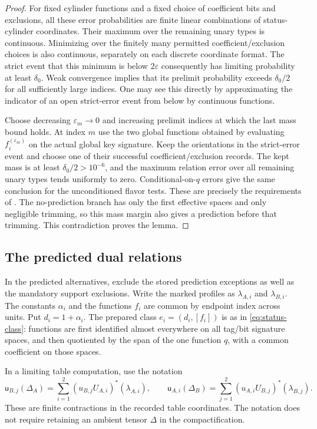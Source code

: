 \begin{proof}
For fixed cylinder functions and a fixed choice of coefficient bits
and exclusions, all these error probabilities are finite linear
combinations of status-cylinder coordinates. Their maximum over the
remaining unary types is continuous. Minimizing over the finitely many
permitted coefficient/exclusion choices is also continuous, separately
on each discrete coordinate format. The strict event that this minimum
is below $2\varepsilon$ consequently has limiting probability at least
$\delta_0$. Weak convergence implies that its prelimit probability
exceeds $\delta_0/2$ for all sufficiently large indices. One may see
this directly by approximating the indicator of an open strict-error
event from below by continuous functions.

Choose decreasing $\varepsilon_m\to0$ and increasing prelimit indices
at which the last mass bound holds. At index $m$ use the two global
functions obtained by evaluating $f_i^{(\varepsilon_m)}$ on the actual
global key signature. Keep the orientations in the strict-error event
and choose one of their successful coefficient/exclusion records.
The kept mass is at least $\delta_0/2>10^{-6}$, and the maximum
relation error over all remaining unary types tends uniformly to zero.
Conditional-on-$q$ errors give the same conclusion for the unconditioned
flavor tests. These are precisely the requirements of
. The no-prediction branch has only the first
effective spaces and only negligible trimming, so this mass margin
also gives a prediction before that trimming. This contradiction
proves the lemma.
\end{proof}

\subsection{The predicted dual relations}

In the predicted alternatives, exclude the stored prediction exceptions
as well as the mandatory support exclusions. Write the marked profiles
as $\lambda_{A,i}$ and $\lambda_{B,i}$. The constants $\alpha_i$ and
the functions $f_i$ are common by endpoint index across units. Put
$d_i=1+\alpha_i$. The prepared class $e_i=(d_i,[f_i])$ is as in
\eqref{eq:status-class}: functions are first identified almost
everywhere on all tag/bit signature spaces, and then quotiented by
the span of the one function $q$, with a common coefficient on those
spaces.

In a limiting table computation, use the notation
\begin{equation}
\label{eq:status-table-delta}
\mathsf u_{B,j}(\Delta_A)
 =\sum_{i=1}^2 (u_{B,j}U_{A,i})^*(\lambda_{A,i}),
\qquad
\mathsf u_{A,i}(\Delta_B)
 =\sum_{j=1}^2 (u_{A,i}U_{B,j})^*(\lambda_{B,j}).
\end{equation}
These are finite contractions in the recorded table coordinates. The
notation does not require retaining an ambient tensor $\Delta$ in the
compactification.


